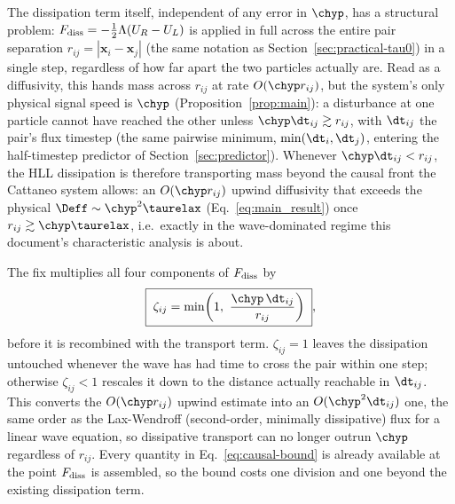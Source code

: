 The dissipation term itself, independent of any error in $\chyp$, has a
structural problem: $F_{\rm diss}=-\tfrac12\Lambda(U_R-U_L)$ is applied in
full across the entire pair separation
$r_{ij}=|\mathbf x_i-\mathbf x_j|$ (the same notation as
Section~\ref{sec:practical-tau0}) in a single step, regardless of how far
apart the two particles actually are. Read as a diffusivity, this hands
mass across $r_{ij}$ at rate $O(\chyp r_{ij})$, but the system's only
physical signal speed is $\chyp$ (Proposition~\ref{prop:main}): a
disturbance at one particle cannot have reached the other unless
$\chyp\dt_{ij}\gtrsim r_{ij}$, with $\dt_{ij}$ the pair's flux timestep
(the same pairwise minimum, $\min(\dt_i,\dt_j)$, entering the
half-timestep predictor of Section~\ref{sec:predictor}). Whenever
$\chyp\dt_{ij}<r_{ij}$, the HLL dissipation is therefore transporting
mass beyond the causal front the Cattaneo system allows: an $O(\chyp
r_{ij})$ upwind diffusivity that exceeds the physical
$\Deff\sim\chyp^2\taurelax$ (Eq.~\eqref{eq:main_result}) once
$r_{ij}\gtrsim\chyp\taurelax$, i.e.\ exactly in the wave-dominated regime
this document's characteristic analysis is about.

The fix multiplies all four components of $F_{\rm diss}$ by
\begin{equation}
  \label{eq:causal-bound}
  \boxed{\;\zeta_{ij} = \min\!\left(1,\ \frac{\chyp\,\dt_{ij}}{r_{ij}}\right)\;} ,
\end{equation}
before it is recombined with the transport term. $\zeta_{ij}=1$ leaves the
dissipation untouched whenever the wave has had time to cross the pair
within one step; otherwise $\zeta_{ij}<1$ rescales it down to the distance
actually reachable in $\dt_{ij}$. This converts the $O(\chyp r_{ij})$
upwind estimate into an $O(\chyp^2\dt_{ij})$ one, the same order as the
Lax-Wendroff (second-order, minimally dissipative) flux for a linear wave
equation, so dissipative transport can no longer outrun $\chyp$
regardless of $r_{ij}$. Every quantity in Eq.~\eqref{eq:causal-bound} is
already available at the point $F_{\rm diss}$ is assembled, so the bound
costs one division and one  beyond the existing dissipation
term.

